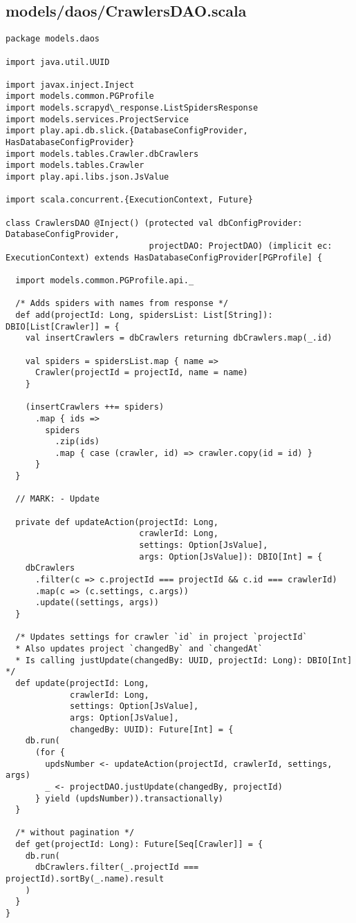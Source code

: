 \subsection{models/daos/CrawlersDAO.scala}
\begin{lstlisting}
package models.daos

import java.util.UUID

import javax.inject.Inject
import models.common.PGProfile
import models.scrapyd\_response.ListSpidersResponse
import models.services.ProjectService
import play.api.db.slick.{DatabaseConfigProvider, HasDatabaseConfigProvider}
import models.tables.Crawler.dbCrawlers
import models.tables.Crawler
import play.api.libs.json.JsValue

import scala.concurrent.{ExecutionContext, Future}

class CrawlersDAO @Inject() (protected val dbConfigProvider: DatabaseConfigProvider,
                             projectDAO: ProjectDAO) (implicit ec: ExecutionContext) extends HasDatabaseConfigProvider[PGProfile] {

  import models.common.PGProfile.api._

  /* Adds spiders with names from response */
  def add(projectId: Long, spidersList: List[String]): DBIO[List[Crawler]] = {
    val insertCrawlers = dbCrawlers returning dbCrawlers.map(_.id)

    val spiders = spidersList.map { name =>
      Crawler(projectId = projectId, name = name)
    }

    (insertCrawlers ++= spiders)
      .map { ids =>
        spiders
          .zip(ids)
          .map { case (crawler, id) => crawler.copy(id = id) }
      }
  }

  // MARK: - Update

  private def updateAction(projectId: Long,
                           crawlerId: Long,
                           settings: Option[JsValue],
                           args: Option[JsValue]): DBIO[Int] = {
    dbCrawlers
      .filter(c => c.projectId === projectId && c.id === crawlerId)
      .map(c => (c.settings, c.args))
      .update((settings, args))
  }

  /* Updates settings for crawler `id` in project `projectId`
  * Also updates project `changedBy` and `changedAt`
  * Is calling justUpdate(changedBy: UUID, projectId: Long): DBIO[Int] */
  def update(projectId: Long,
             crawlerId: Long,
             settings: Option[JsValue],
             args: Option[JsValue],
             changedBy: UUID): Future[Int] = {
    db.run(
      (for {
        updsNumber <- updateAction(projectId, crawlerId, settings, args)
        _ <- projectDAO.justUpdate(changedBy, projectId)
      } yield (updsNumber)).transactionally)
  }

  /* without pagination */
  def get(projectId: Long): Future[Seq[Crawler]] = {
    db.run(
      dbCrawlers.filter(_.projectId === projectId).sortBy(_.name).result
    )
  }
}
\end{lstlisting}
